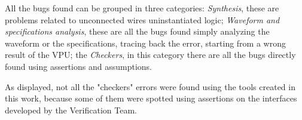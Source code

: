 All the bugs found can be grouped in three categories: \emph{Synthesis}, these are problems related to unconnected wires uninstantiated logic; \emph{Waveform and specifications analysis}, these are all the bugs found simply analyzing the waveform or the specifications, tracing back the error, starting from a wrong result of the VPU; the \emph{Checkers}, in this category there are all the bugs directly found using assertions and assumptions.

As displayed, not all the "checkers" errors were found using the tools created in this work, because some of them were spotted using assertions on the interfaces developed by the Verification Team.

